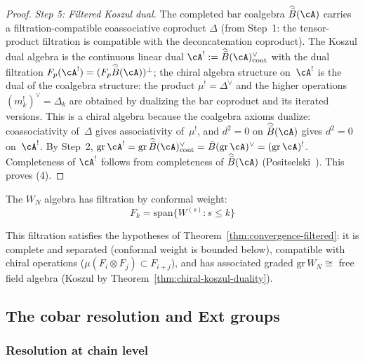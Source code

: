 \begin{proof}
\emph{Step 5: Filtered Koszul dual.}
The completed bar coalgebra $\widehat{\bar{B}}(\cA)$ carries a filtration-compatible
coassociative coproduct $\Delta$ (from Step~1: the tensor-product
filtration is compatible with the deconcatenation coproduct). The
Koszul dual algebra is the continuous linear dual
$\cA^! := \widehat{\bar{B}}(\cA)^\vee_{\mathrm{cont}}$ with the dual filtration
$F_p(\cA^!) = (F_p\widehat{\bar{B}}(\cA))^\perp$; the chiral algebra structure
on~$\cA^!$ is the dual of the coalgebra structure: the product
$\mu^! = \Delta^\vee$ and the higher operations
$(m_k^!)^\vee = \Delta_k$ are obtained by dualizing the
bar coproduct and its iterated versions. This is a chiral algebra
because the coalgebra axioms
dualize: coassociativity of~$\Delta$ gives associativity of~$\mu^!$,
and $d^2 = 0$ on $\widehat{\bar{B}}(\cA)$ gives $d^2 = 0$
on~$\cA^!$. By Step~2,
$\mathrm{gr}\,\cA^! = \mathrm{gr}\,\widehat{\bar{B}}(\cA)^\vee_{\mathrm{cont}}
= \bar{B}(\mathrm{gr}\,\cA)^\vee
= (\mathrm{gr}\,\cA)^!$.
Completeness of $\cA^!$ follows from completeness of
$\widehat{\bar{B}}(\cA)$ (Positselski~\cite[\S A.1]{Positselski11}).
This proves (4).
\end{proof}

\begin{example}
The $W_N$ algebra has filtration by conformal weight:
\[F_k = \mathrm{span}\{W^{(s)} : s \leq k\}\]

This filtration satisfies the hypotheses of Theorem~\ref{thm:convergence-filtered}: it is complete and separated (conformal weight is bounded below), compatible with chiral operations ($\mu(F_i \otimes F_j) \subset F_{i+j}$), and has associated graded $\mathrm{gr}\,W_N \cong$ free field algebra (Koszul by Theorem~\ref{thm:chiral-koszul-duality}).
\end{example}


\subsection{The cobar resolution and Ext groups}

\subsubsection{Resolution at chain level}

